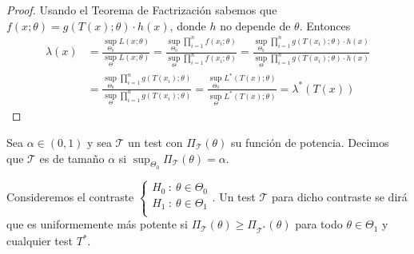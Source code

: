 \begin{proof}
    Usando el Teorema de Factrización sabemos que $f(x;\theta) = g(T(x);\theta) \cdot h(x)$, donde $h$ no depende de $\theta$. Entonces
    \begin{align*}
        \lambda(x) & = \frac{\sup_{\Theta_0}L(x;\theta)}{\sup_{\Theta}L(x;\theta)} = \frac{\sup_{\Theta_0} \prod_{i=1}^{n}f(x_i;\theta)}{\sup_{\Theta} \prod_{i=1}^{n}f(x_i;\theta)} = \frac{\sup_{\Theta_0} \prod_{i=1}^{n}g(T(x_i);\theta) \cdot h(x)}{\sup_{\Theta} \prod_{i=1}^{n}g(T(x_i);\theta) \cdot h(x)} \\
                   & = \frac{\sup_{\Theta_0} \prod_{i=1}^{n}g(T(x_i);\theta)}{\sup_{\Theta} \prod_{i=1}^{n}g(T(x_i);\theta)} = \frac{\sup_{\Theta_0}L^*(T(x);\theta)}{\sup_{\Theta}L^*(T(x);\theta)} = \lambda^*(T(x))
    \end{align*}
\end{proof}

\begin{defi}
    Sea $\alpha \in (0,1)$ y sea $\mathcal{T}$ un test con $\Pi_{\mathcal{T}}(\theta)$ su función de potencia. Decimos que $\mathcal{T}$ es de tamaño $\alpha$ si $\sup_{\Theta_0} \Pi_{\mathcal{T}}(\theta) = \alpha$.
\end{defi}

\begin{defi}
    Consideremos el contraste $
        \left\{ \begin{array}{lcc}
            H_0 \ : \ \theta \in \Theta_0 \\
            H_1 \ : \ \theta \in \Theta_1 \\
        \end{array}
        \right.
    $. Un test $\mathcal{T}$ para dicho contraste se dirá que es uniformemente más potente si $\Pi_{\mathcal{T}}(\theta) \ge \Pi_{\mathcal{T^*}}(\theta)$ para todo $\theta \in \Theta_1$ y cualquier test $T^*$.
\end{defi}

